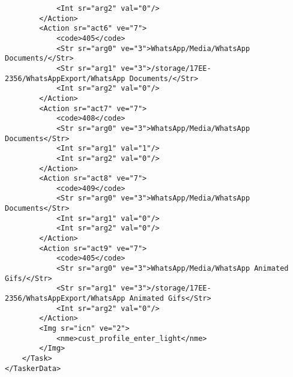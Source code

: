 \begin{verbatim}
            <Int sr="arg2" val="0"/>
        </Action>
        <Action sr="act6" ve="7">
            <code>405</code>
            <Str sr="arg0" ve="3">WhatsApp/Media/WhatsApp Documents/</Str>
            <Str sr="arg1" ve="3">/storage/17EE-2356/WhatsAppExport/WhatsApp Documents/</Str>
            <Int sr="arg2" val="0"/>
        </Action>
        <Action sr="act7" ve="7">
            <code>408</code>
            <Str sr="arg0" ve="3">WhatsApp/Media/WhatsApp Documents</Str>
            <Int sr="arg1" val="1"/>
            <Int sr="arg2" val="0"/>
        </Action>
        <Action sr="act8" ve="7">
            <code>409</code>
            <Str sr="arg0" ve="3">WhatsApp/Media/WhatsApp Documents</Str>
            <Int sr="arg1" val="0"/>
            <Int sr="arg2" val="0"/>
        </Action>
        <Action sr="act9" ve="7">
            <code>405</code>
            <Str sr="arg0" ve="3">WhatsApp/Media/WhatsApp Animated Gifs/</Str>
            <Str sr="arg1" ve="3">/storage/17EE-2356/WhatsAppExport/WhatsApp Animated Gifs</Str>
            <Int sr="arg2" val="0"/>
        </Action>
        <Img sr="icn" ve="2">
            <nme>cust_profile_enter_light</nme>
        </Img>
    </Task>
</TaskerData>
\end{verbatim}
